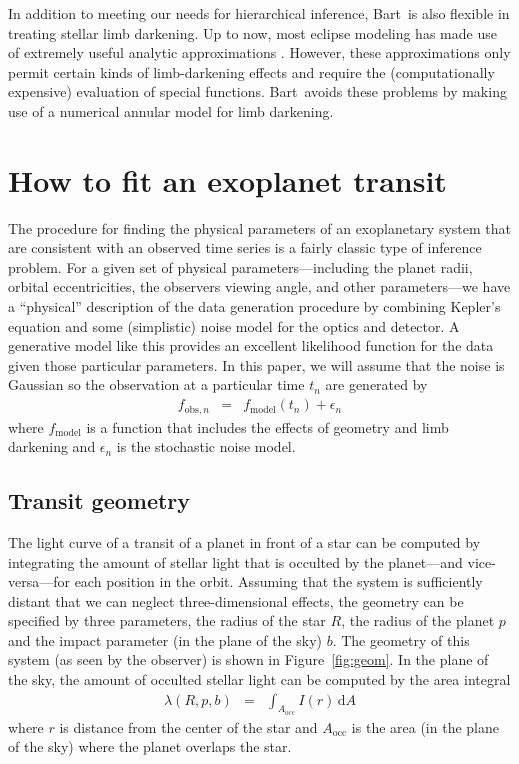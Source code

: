 \documentclass[12pt,preprint]{aastex}
\newcommand{\project}[1]{{\sffamily #1}}
\newcommand{\bart}{\project{Bart}}
\newcommand{\Fig}[1]{Figure~\ref{fig:#1}}
\newcommand{\fig}[1]{\Fig{#1}}
\newcommand{\eqlabel}[1]{\label{eq:#1}}
\newcommand{\dd}{\mathrm{d}}
\begin{document}
In addition to meeting our needs for hierarchical inference, \bart\ is
also flexible in treating stellar limb darkening.  Up to now, most
eclipse modeling has made use of extremely useful analytic
approximations \citep{mandel}.  However, these approximations only
permit certain kinds of limb-darkening effects and require the
(computationally expensive) evaluation of special functions.
\bart\ avoids these problems by making use of a numerical annular
model for limb darkening.

\section{How to fit an exoplanet transit}

The procedure for finding the physical parameters of an exoplanetary system
that are consistent with an observed time series is a fairly classic type of
inference problem. For a given set of physical parameters---including the
planet radii, orbital eccentricities, the observers viewing angle, and other
parameters---we have a ``physical'' description of the data generation
procedure by combining Kepler's equation and some (simplistic) noise model for
the optics and detector. A generative model like this provides an excellent
likelihood function for the data given those particular parameters. In this
paper, we will assume that the noise is Gaussian so the observation at a
particular time $t_n$ are generated by
\begin{eqnarray}
    f_{\mathrm{obs},n} & = & f_\mathrm{model} (t_n) + \epsilon_n
\end{eqnarray}
where $f_\mathrm{model}$ is a function that includes the effects of geometry
and limb darkening and $\epsilon_n$ is the stochastic noise model.

\subsection{Transit geometry}

The light curve of a transit of a planet in front of a star can be computed by
integrating the amount of stellar light that is occulted by the planet---and
vice-versa---for
each position in the orbit. Assuming that the system is sufficiently distant
that we can neglect three-dimensional effects, the geometry can be specified
by three parameters, the radius of the star $R$, the radius of the planet $p$
and the impact parameter (in the plane of the sky) $b$. The geometry
of this system (as seen by the observer) is shown in \fig{geom}. In the plane
of the sky, the amount of occulted stellar light can be computed by the area
integral
\begin{eqnarray}\eqlabel{general-occ}
    \lambda (R, p, b) & = & \int_{A_\mathrm{occ}} I(r) \, \dd A
\end{eqnarray}
where $r$ is distance from the center of the star and $A_\mathrm{occ}$ is the
area (in the plane of the sky) where the planet overlaps the star.
\end{document}
